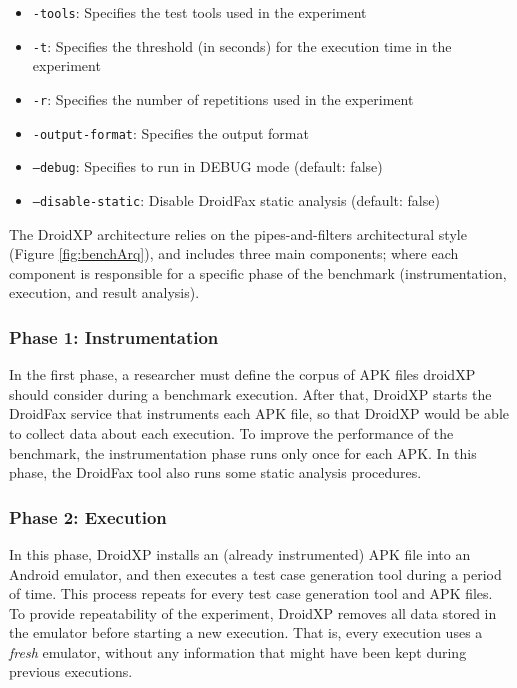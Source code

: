 \begin{itemize}
    \item \texttt{-tools}: Specifies the test tools used in the experiment
    \item \texttt{-t}: Specifies the threshold (in seconds) for the execution time in the experiment
    \item \texttt{-r}: Specifies the number of repetitions used in the experiment
    \item \texttt{-output-format}: Specifies the output format
    \item \texttt{--debug}: Specifies to run in DEBUG mode (default: false)
    \item \texttt{--disable-static}: Disable DroidFax static analysis (default: false)
    
    
\end{itemize}

The DroidXP architecture relies on the pipes-and-filters architectural style \cite{architecture-book} (Figure \ref{fig:benchArq}),
and includes three main components; where each component is responsible for a specific phase of the
benchmark (instrumentation, execution, and result analysis).

\subsubsection{Phase 1: Instrumentation}

In the first phase, a researcher must define the corpus of APK files droidXP should consider during a benchmark execution. After that, DroidXP starts the DroidFax service that instruments each APK file, so that DroidXP would be able to collect data about each execution. To improve the performance of the benchmark, the instrumentation phase runs only once for each APK. In this phase, the DroidFax tool also runs some static analysis procedures.

\subsubsection{Phase 2: Execution}

In this phase, DroidXP installs an (already instrumented) APK file into
an Android emulator, and then executes a test case generation tool
during a period of time. This process repeats for every test case generation
tool and APK files. To provide repeatability of the experiment, DroidXP removes all data stored in the emulator before starting
a new execution. That is, every execution uses a \emph{fresh} emulator,
without any information that might have been kept during
previous executions. 

